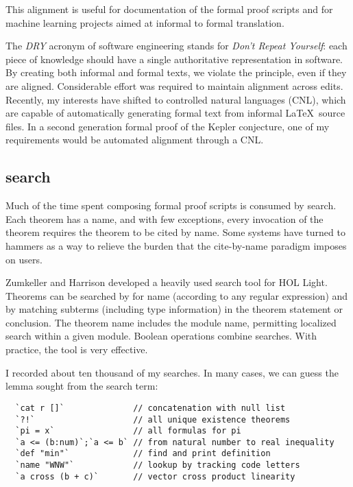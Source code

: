 \documentclass{amsart}
\begin{document}
This alignment is useful for documentation of the formal proof scripts
and for machine learning projects aimed at informal to formal
translation.

The \emph{DRY} acronym of software engineering stands for \emph{Don't
  Repeat Yourself}: each piece of knowledge should have a single
authoritative representation in software.  By creating both informal
and formal texts, we violate the principle, even if they are aligned.
Considerable effort was required to maintain alignment across edits.
Recently, my interests have shifted to controlled natural languages
(CNL), which are capable of automatically generating formal text from
informal \LaTeX\ source files.  In a second generation formal proof of
the Kepler conjecture, one of my requirements would be automated
alignment through a CNL.

\subsection{search}

Much of the time spent composing formal proof scripts is consumed by
search.  Each theorem has a name, and with few exceptions, every
invocation of the theorem requires the theorem to be cited by name.
Some systems have turned to hammers as a way to relieve the burden
that the cite-by-name paradigm imposes on users.

Zumkeller and Harrison developed a heavily used search tool for HOL
Light.  Theorems can be searched by for name (according to any regular
expression) and by matching subterms (including type information) in
the theorem statement or conclusion.  The theorem name includes the
module name, permitting localized search within a given module.
Boolean operations combine searches.  With practice, the tool is
very effective.

I recorded about ten thousand of my searches.  In many
cases, we can guess the lemma sought from the search term:

\begin{verbatim}
  `cat r []`              // concatenation with null list
  `?!`                    // all unique existence theorems
  `pi = x`                // all formulas for pi
  `a <= (b:num)`;`a <= b` // from natural number to real inequality
  `def "min"`             // find and print definition
  `name "WNW"`            // lookup by tracking code letters
  `a cross (b + c)`       // vector cross product linearity
\end{verbatim}
\end{document}
